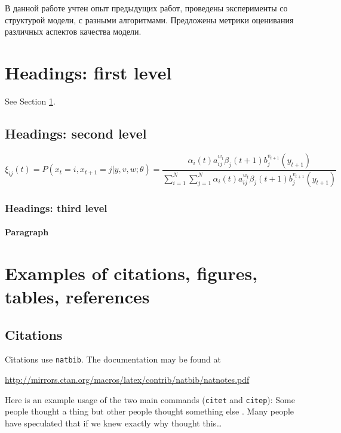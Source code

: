\documentclass{article}
\begin{document}
В данной работе учтен опыт предыдущих работ, проведены эксперименты со структурой модели, с разными алгоритмами. Предложены метрики оценивания различных аспектов качества модели. 

\section{Headings: first level}
\label{sec:headings}

\lipsum[4] See Section \ref{sec:headings}.

\subsection{Headings: second level}
\lipsum[5]
\begin{equation}
	\xi _{ij}(t)=P(x_{t}=i,x_{t+1}=j|y,v,w;\theta)= {\frac {\alpha _{i}(t)a^{w_t}_{ij}\beta _{j}(t+1)b^{v_{t+1}}_{j}(y_{t+1})}{\sum _{i=1}^{N} \sum _{j=1}^{N} \alpha _{i}(t)a^{w_t}_{ij}\beta _{j}(t+1)b^{v_{t+1}}_{j}(y_{t+1})}}
\end{equation}

\subsubsection{Headings: third level}
\lipsum[6]

\paragraph{Paragraph}
\lipsum[7]



\section{Examples of citations, figures, tables, references}
\label{sec:others}

\subsection{Citations}
Citations use \verb+natbib+. The documentation may be found at
\begin{center}
	\url{http://mirrors.ctan.org/macros/latex/contrib/natbib/natnotes.pdf}
\end{center}

Here is an example usage of the two main commands (\verb+citet+ and \verb+citep+): Some people thought a thing \citep{kour2014real, hadash2018estimate} but other people thought something else \citep{kour2014fast}. Many people have speculated that if we knew exactly why \citet{kour2014fast} thought this\dots
\end{document}
